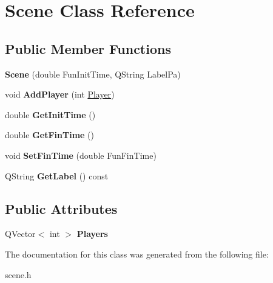 \hypertarget{classScene}{\section{Scene Class Reference}
\label{classScene}
}
\subsection*{Public Member Functions}
\begin{DoxyCompactItemize}
\item 
\hypertarget{classScene_aaa81008f41154cc769e9bb7bcbd12848}{{\bfseries Scene} (double Fun\-Init\-Time, Q\-String Label\-Pa)}\label{classScene_aaa81008f41154cc769e9bb7bcbd12848}

\item 
\hypertarget{classScene_a2eff52baba0b72c10353d6eb955fae89}{void {\bfseries Add\-Player} (int \hyperlink{classPlayer}{Player})}\label{classScene_a2eff52baba0b72c10353d6eb955fae89}

\item 
\hypertarget{classScene_a1d53c932387315709caefce7dead7337}{double {\bfseries Get\-Init\-Time} ()}\label{classScene_a1d53c932387315709caefce7dead7337}

\item 
\hypertarget{classScene_a38ec70e43222865dd455ec5540a8f2ba}{double {\bfseries Get\-Fin\-Time} ()}\label{classScene_a38ec70e43222865dd455ec5540a8f2ba}

\item 
\hypertarget{classScene_a160577801115c5987b474af5fb6db6d0}{void {\bfseries Set\-Fin\-Time} (double Fun\-Fin\-Time)}\label{classScene_a160577801115c5987b474af5fb6db6d0}

\item 
\hypertarget{classScene_a61cc64b393317b62ee3734afe852a4f6}{Q\-String {\bfseries Get\-Label} () const }\label{classScene_a61cc64b393317b62ee3734afe852a4f6}

\end{DoxyCompactItemize}
\subsection*{Public Attributes}
\begin{DoxyCompactItemize}
\item 
\hypertarget{classScene_a407c1509f4bbddc027ea67bccc0e063a}{Q\-Vector$<$ int $>$ {\bfseries Players}}\label{classScene_a407c1509f4bbddc027ea67bccc0e063a}

\end{DoxyCompactItemize}


The documentation for this class was generated from the following file\-:\begin{DoxyCompactItemize}
\item 
scene.\-h\end{DoxyCompactItemize}

